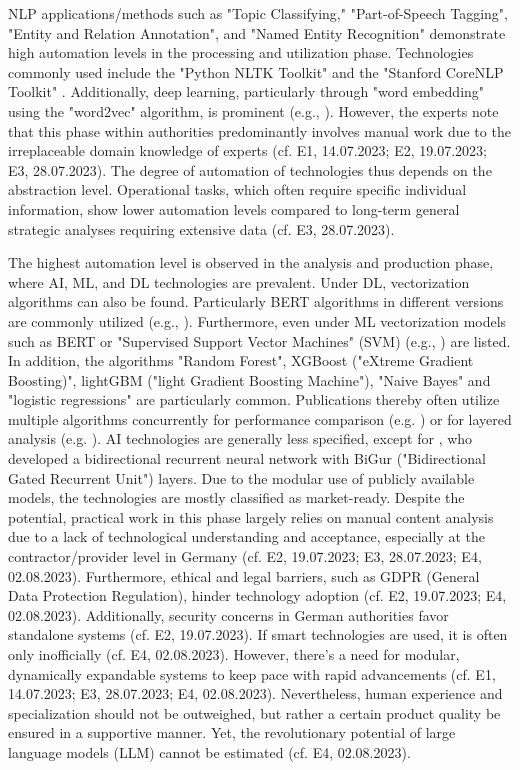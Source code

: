 \documentclass[10pt]{article}
\begin{document}
NLP applications/methods such as "Topic Classifying," "Part-of-Speech Tagging", "Entity and Relation Annotation", and "Named Entity Recognition"
demonstrate high automation levels in the processing and utilization phase. Technologies commonly used include
the "Python NLTK Toolkit" \cite{Hubbard.2022} and the "Stanford CoreNLP Toolkit" \cite{Middleton.2020}.
Additionally, deep learning, particularly through "word embedding" using the "word2vec" algorithm, is prominent
(e.g., \cite{Bai.2020}). However, the experts note that
this phase within authorities predominantly involves manual work due to the irreplaceable domain knowledge of experts
(cf. E1, 14.07.2023; E2, 19.07.2023; E3, 28.07.2023). The degree of automation of technologies thus depends on the abstraction level.
Operational tasks, which often require specific individual information, show lower automation levels compared to long-term general strategic analyses
requiring extensive data (cf. E3, 28.07.2023).

The highest automation level is observed in the analysis and production phase, where AI, ML, and DL technologies are prevalent.
Under DL, vectorization algorithms can also be found. Particularly BERT algorithms in different versions are commonly utilized
(e.g., \cite{Ma.2022}). Furthermore, even under ML vectorization models such as BERT or
"Supervised Support Vector Machines" (SVM) (e.g., \cite{Iorga.2020}) are listed.
In addition, the algorithms "Random Forest", XGBoost ("eXtreme Gradient Boosting)",
lightGBM ("light Gradient Boosting Machine"), "Naive Bayes" and "logistic regressions" are particularly common.
Publications thereby often utilize multiple algorithms concurrently for performance comparison (e.g. \cite{Tao.2023})
or for layered analysis (e.g. \cite{Yang.2022}). AI technologies are generally less specified,
except for \cite{Dale.2023}, who developed a bidirectional recurrent neural network with
BiGur ("Bidirectional Gated Recurrent Unit") layers. Due to the modular use of publicly available models,
the technologies are mostly classified as market-ready. Despite the potential, practical work in this phase
largely relies on manual content analysis due to a lack of technological understanding and acceptance,
especially at the contractor/provider level in Germany (cf. E2, 19.07.2023; E3, 28.07.2023; E4, 02.08.2023). Furthermore,
ethical and legal barriers, such as GDPR (General Data Protection Regulation), hinder technology adoption
(cf. E2, 19.07.2023; E4, 02.08.2023). Additionally, security concerns in German authorities favor
standalone systems (cf. E2, 19.07.2023). If smart technologies are used, it is often only inofficially
(cf. E4, 02.08.2023). However, there's a need for modular, dynamically expandable
systems to keep pace with rapid advancements (cf. E1, 14.07.2023; E3, 28.07.2023; E4, 02.08.2023).
Nevertheless, human experience and specialization should not be outweighed, but rather a certain product quality
be ensured in a supportive manner. Yet, the revolutionary potential of large language models (LLM) cannot be estimated (cf. E4, 02.08.2023).
\end{document}
